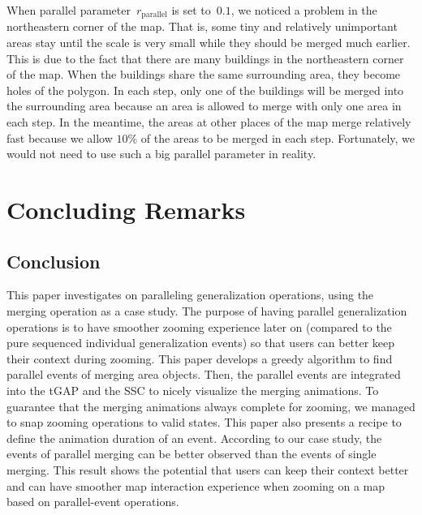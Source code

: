 \documentclass[]{interact}
\begin{document}
When parallel parameter~$r_\mathrm{parallel}$ is set to~$0.1$,
we noticed a problem in the northeastern corner of the map.
That is, some tiny and relatively unimportant areas stay 
until the scale is very small
while they should be merged much earlier.
This is due to the fact that 
there are many buildings in the northeastern corner of the map.
When the buildings share the same surrounding area,
they become holes of the polygon.
In each step, only one of the buildings will be merged into the surrounding area
because an area is allowed to merge with only one area in each step.
In the meantime, the areas at other places of the map merge relatively fast
because we allow $10\%$ of the areas to be merged in each step.
Fortunately, we would not need to use such a big parallel parameter in reality.




\section{Concluding Remarks}
\label{sec:concluding_remarks}

\subsection{Conclusion}
This paper investigates on paralleling generalization operations,
using the merging operation as a case study. 
The purpose of having parallel generalization operations 
is to have smoother zooming experience later on 
(compared to the pure sequenced individual generalization events)
so that users can better keep their context during zooming.
This paper develops a greedy algorithm to find parallel events of 
merging area objects.
Then, the parallel events are integrated into 
the tGAP and the SSC to nicely visualize the merging animations.
To guarantee that the merging animations always complete for zooming, 
we managed to snap zooming operations to valid states.
This paper also presents a recipe 
to define the animation duration of an event.
According to our case study,
the events of parallel merging 
can be better observed than the events of single merging.
This result shows the potential that
users can keep their context better 
and can have smoother map interaction experience
when zooming on a map based on parallel-event operations.
\end{document}
